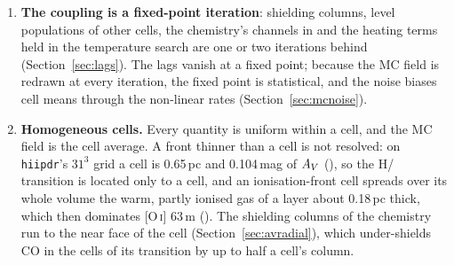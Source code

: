 \begin{enumerate}
\item \textbf{The coupling is a fixed-point iteration}: shielding columns, level
  populations of other cells, the chemistry's channels in  and
  the heating terms held in the temperature search are one or two iterations
  behind (Section~\ref{sec:lags}). The lags vanish at a fixed point; because
  the MC field is redrawn at every iteration, the fixed point is statistical,
  and the noise biases cell means through the non-linear rates
  (Section~\ref{sec:mcnoise}).
\item \textbf{Homogeneous cells.} Every quantity is uniform within a cell, and
  the MC field is the cell average. A front thinner than a cell is not
  resolved: on \texttt{hiipdr}'s $31^3$ grid a cell is 0.65\,pc and 0.104\,mag of
  $A_{V}$ (), so the H/\Htwo{} transition is located only to a cell,
  and an ionisation-front cell spreads over its whole volume the warm, partly
  ionised gas of a layer about 0.18\,pc thick, which then dominates
  [O\,\textsc{i}] 63\,\textmu m (). The shielding columns of the chemistry run to the near face of
  the cell (Section~\ref{sec:avradial}), which under-shields CO in the cells of
  its transition by up to half a cell's column.
\end{enumerate}

